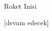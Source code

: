 \documentclass[12pt,fleqn]{article}\usepackage{../../common}
\begin{document}
Roket Inisi


[devam edecek]
\end{document}
